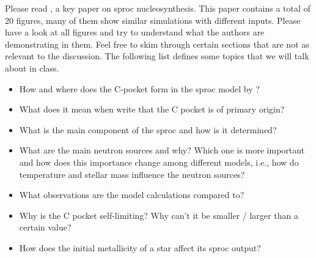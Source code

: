 Please read \citet{gallino98}, a key paper on \ac{sproc} nucleosynthesis. This paper contains a total of 20 figures, many of them show similar simulations with different inputs. Please have a look at all figures and try to understand what the authors are demonstrating in them. Feel free to skim through certain sections that are not as relevant to the discussion. The following list defines some topics that we will talk about in class.
\begin{itemize}
    \item How and where does the C-pocket form in the \ac{sproc} model by \citet{gallino98}?
    \item What does it mean when \citet{gallino98} write that the C pocket is of primary origin?
    \item What is the main component of the \ac{sproc} and how is it determined?
    \item What are the main neutron sources and why? Which one is more important and how does this importance change among different models, i.e., how do temperature and stellar mass influence the neutron sources?
    \item What observations are the model calculations compared to?
    \item Why is the C pocket self-limiting? Why can't it be smaller / larger than a certain value?
    \item How does the initial metallicity of a star affect its \ac{sproc} output?
\end{itemize}
